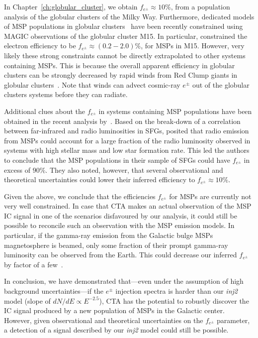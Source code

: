 \documentclass[doublespace,nopageskip]{VTthesis}
\begin{document}
In Chapter~\ref{ch:globular_cluster}, we obtain $f_{e^\pm}\approx 10\%$, from a population analysis of the globular clusters of the Milky Way. Furthermore, dedicated models of MSP populations in globular clusters~\citep{2016MNRAS.458.1083B,2018MNRAS.473..897N} have been recently constrained using MAGIC observations of the globular cluster M15. In particular, \cite{2019MNRAS.484.2876M} constrained the electron efficiency to be $f_{e^{\pm}}\approx (0.2-2.0)\%$, for MSPs in M15. However, very likely these strong constraints cannot be directly extrapolated to other systems containing MSPs. This is because the overall apparent efficiency in globular clusters can be strongly decreased by rapid winds from Red Clump giants in globular clusters~\citep{2016MNRAS.458.1083B}. Note that winds can advect cosmic-ray $e^\pm$ out of the globular clusters systems before they can radiate.

Additional clues about the $f_{e^{\pm}}$ in systems containing MSP populations have been obtained in the recent analysis by~\citet{2021PhRvD.103h3017S}. 
%
Based on the break-down of a correlation 
between far-infrared and radio luminosities in SFGs, \citet{2021PhRvD.103h3017S} posited that radio emission from MSPs could account for a large fraction of the radio luminosity observed in systems with high stellar mass and low star formation rate. This led the authors to conclude that the MSP populations in their sample of SFGs could have $f_{e^{\pm}}$ in excess of $90\%$. They also noted, however, that several observational and theoretical uncertainties could lower their inferred efficiency to $f_{e^{\pm}}\approx 10\%$. 

 

Given the above, 
we conclude that the efficiencies $f_{e^{\pm}}$ for MSPs are currently not very well constrained. In case that CTA makes an actual observation of the MSP IC signal in one of the scenarios disfavoured by our analysis, it could still be possible to reconcile such an observation with the MSP emission models. In particular, if the gamma-ray emission from the Galactic bulge MSPs magnetosphere is beamed, only some fraction of their prompt gamma-ray luminosity can be observed from the Earth. This could decrease our inferred $f_{e^{\pm}}$ by factor of a few~\citep{2021PhRvD.103h3017S}.  

In conclusion, we have demonstrated that---even under the assumption of high background uncertainties---if the $e^\pm$ injection spectra is harder than our \textit{inj2} model (slope of $dN/dE \propto E^{-2.5}$),  CTA has the potential to robustly discover the IC signal produced by a new population of MSPs in the Galactic center. However, given observational and theoretical uncertainties on the $f_{e^{\pm}}$ parameter, a detection of a signal described by our \textit{inj2} model could still be possible. 
\end{document}
